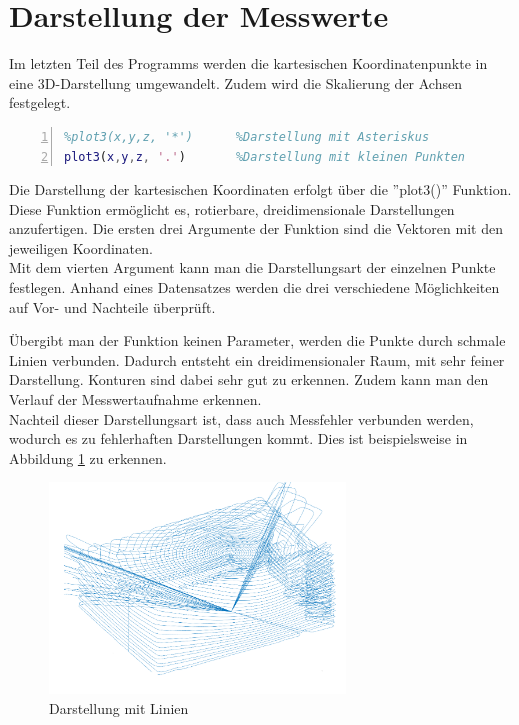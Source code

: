 \section{Darstellung der Messwerte}

Im letzten Teil des Programms werden die kartesischen Koordinatenpunkte in eine 3D-Darstellung umgewandelt. Zudem wird die Skalierung der Achsen festgelegt.


\begin{lstlisting}[caption={Darstellung der Messwerte},language={Matlab}, label={import_data}, numbers=left]
%plot3(x,y,z)			%Darstellung mit Linien
%plot3(x,y,z, '*')		%Darstellung mit Asteriskus 
plot3(x,y,z, '.')		%Darstellung mit kleinen Punkten
\end{lstlisting}

Die Darstellung der kartesischen Koordinaten erfolgt über die ''plot3()'' Funktion. Diese Funktion ermöglicht es, rotierbare, dreidimensionale Darstellungen anzufertigen. Die ersten drei Argumente der Funktion sind die Vektoren mit den jeweiligen Koordinaten.\\
Mit dem vierten Argument kann man die Darstellungsart der einzelnen Punkte festlegen. Anhand eines Datensatzes werden die drei verschiedene Möglichkeiten auf Vor- und Nachteile überprüft.

Übergibt man der Funktion keinen Parameter, werden die Punkte durch schmale Linien verbunden. Dadurch entsteht ein dreidimensionaler Raum, mit sehr feiner Darstellung. Konturen sind dabei sehr gut zu erkennen. Zudem kann man den Verlauf der Messwertaufnahme erkennen. \\
Nachteil dieser Darstellungsart ist, dass auch Messfehler verbunden werden, wodurch es zu fehlerhaften Darstellungen kommt. Dies ist beispielsweise in Abbildung \ref{linien} zu erkennen.


\begin{figure}[H]
	\centering
	\includegraphics[width=0.7\textwidth]{images/Auswertung/Linien}
	\caption{Darstellung mit Linien}
	\label{linien}
\end{figure}

